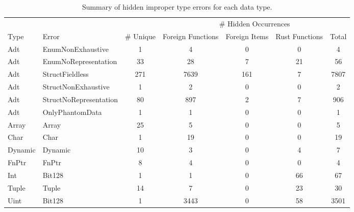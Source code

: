 \begin{table}[ht]
\centering
\begin{tabular}{llccccc}
  \hline
  & & & \multicolumn{4}{c}{# Hidden Occurrences} \\
 Type & Error & # Unique & Foreign Functions & Foreign Items & Rust Functions & Total \\
 \hline
Adt & EnumNonExhaustive & 1 & 4 & 0 & 0 & 4 \\ 
  Adt & EnumNoRepresentation & 33 & 28 & 7 & 21 & 56 \\ 
  Adt & StructFieldless & 271 & 7639 & 161 & 7 & 7807 \\ 
  Adt & StructNonExhaustive & 1 & 2 & 0 & 0 & 2 \\ 
  Adt & StructNoRepresentation & 80 & 897 & 2 & 7 & 906 \\ 
  Adt & OnlyPhantomData & 1 & 1 & 0 & 0 & 1 \\ 
  Array & Array & 25 & 5 & 0 & 0 & 5 \\ 
  Char & Char & 1 & 19 & 0 & 0 & 19 \\ 
  Dynamic & Dynamic & 10 & 3 & 0 & 4 & 7 \\ 
  FnPtr & FnPtr & 8 & 4 & 0 & 0 & 4 \\ 
  Int & Bit128 & 1 & 1 & 0 & 66 & 67 \\ 
  Tuple & Tuple & 14 & 7 & 0 & 23 & 30 \\ 
  Uint & Bit128 & 1 & 3443 & 0 & 58 & 3501 \\ 
   \hline
\end{tabular}
\caption{Summary of hidden improper type errors for each data type.} 
\label{table:error_type_counts}
\end{table}

